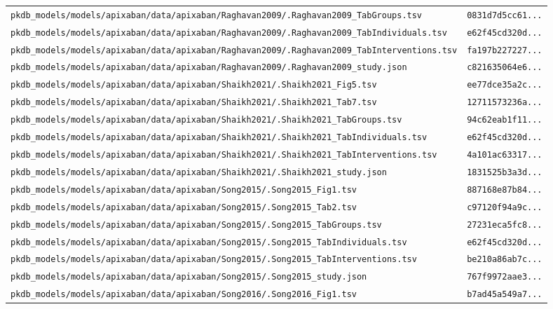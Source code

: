 \documentclass{article}
\begin{document}
\begin{longtable}{ll}
\texttt{pkdb\_models/models/apixaban/data/apixaban/Raghavan2009/.Raghavan2009\_TabGroups.tsv} & \texttt{0831d7d5cc61...} \\
\texttt{pkdb\_models/models/apixaban/data/apixaban/Raghavan2009/.Raghavan2009\_TabIndividuals.tsv} & \texttt{e62f45cd320d...} \\
\texttt{pkdb\_models/models/apixaban/data/apixaban/Raghavan2009/.Raghavan2009\_TabInterventions.tsv} & \texttt{fa197b227227...} \\
\texttt{pkdb\_models/models/apixaban/data/apixaban/Raghavan2009/.Raghavan2009\_study.json} & \texttt{c821635064e6...} \\
\texttt{pkdb\_models/models/apixaban/data/apixaban/Shaikh2021/.Shaikh2021\_Fig5.tsv} & \texttt{ee77dce35a2c...} \\
\texttt{pkdb\_models/models/apixaban/data/apixaban/Shaikh2021/.Shaikh2021\_Tab7.tsv} & \texttt{12711573236a...} \\
\texttt{pkdb\_models/models/apixaban/data/apixaban/Shaikh2021/.Shaikh2021\_TabGroups.tsv} & \texttt{94c62eab1f11...} \\
\texttt{pkdb\_models/models/apixaban/data/apixaban/Shaikh2021/.Shaikh2021\_TabIndividuals.tsv} & \texttt{e62f45cd320d...} \\
\texttt{pkdb\_models/models/apixaban/data/apixaban/Shaikh2021/.Shaikh2021\_TabInterventions.tsv} & \texttt{4a101ac63317...} \\
\texttt{pkdb\_models/models/apixaban/data/apixaban/Shaikh2021/.Shaikh2021\_study.json} & \texttt{1831525b3a3d...} \\
\texttt{pkdb\_models/models/apixaban/data/apixaban/Song2015/.Song2015\_Fig1.tsv} & \texttt{887168e87b84...} \\
\texttt{pkdb\_models/models/apixaban/data/apixaban/Song2015/.Song2015\_Tab2.tsv} & \texttt{c97120f94a9c...} \\
\texttt{pkdb\_models/models/apixaban/data/apixaban/Song2015/.Song2015\_TabGroups.tsv} & \texttt{27231eca5fc8...} \\
\texttt{pkdb\_models/models/apixaban/data/apixaban/Song2015/.Song2015\_TabIndividuals.tsv} & \texttt{e62f45cd320d...} \\
\texttt{pkdb\_models/models/apixaban/data/apixaban/Song2015/.Song2015\_TabInterventions.tsv} & \texttt{be210a86ab7c...} \\
\texttt{pkdb\_models/models/apixaban/data/apixaban/Song2015/.Song2015\_study.json} & \texttt{767f9972aae3...} \\
\texttt{pkdb\_models/models/apixaban/data/apixaban/Song2016/.Song2016\_Fig1.tsv} & \texttt{b7ad45a549a7...} \\

\end{longtable}
\end{document}
